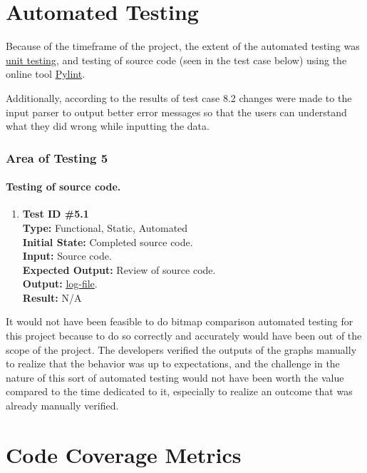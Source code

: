 \documentclass[12pt, titlepage]{article}
\begin{document}
\section{Automated Testing}
Because of the timeframe of the project, the extent of the automated testing was \hyperref[sec:unittest]{unit testing}, and testing of source code (seen in the test case below) using the online tool \href{https://www.pylint.org}{Pylint}.

Additionally, according to the results of test case 8.2 changes were made to the input parser to output better error messages so that the users can understand what they did wrong while inputting the data.

\subsubsection{Area of Testing 5}		
	\paragraph{Testing of source code.}
		\begin{enumerate}
			\item{\textbf{Test ID \#5.1\\}}
			\textbf{Type:} Functional, Static, Automated\\
			\textbf{Initial State:} Completed source code. \\
			\textbf{Input:} Source code.\\
			\textbf{Expected Output:} Review of source code.\\
			\textbf{Output:}	 \href{run:code_eval.txt} {\underline{log-file}}.\\
			\textbf{Result:} N/A
		\end{enumerate}

It would not have been feasible to do bitmap comparison automated testing for this project because to do so correctly and accurately would have been out of the scope of the project. The developers verified the outputs of the graphs manually to realize that the behavior was up to expectations, and the challenge in the nature of this sort of automated testing would not have been worth the value compared to the time dedicated to it, especially to realize an outcome that was already manually verified.
		

\section{Code Coverage Metrics} %


\end{document}
